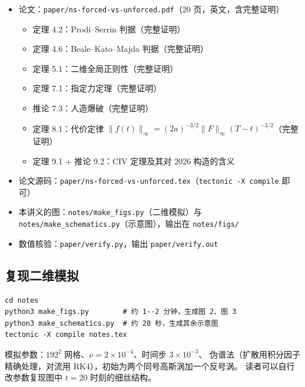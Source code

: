 \documentclass[11pt,a4paper]{article}
\begin{document}
\begin{itemize}[leftmargin=1.6em]
\item 论文：\texttt{paper/ns-forced-vs-unforced.pdf}（20 页，英文，含完整证明）
      \begin{itemize}
      \item 定理 4.2：Prodi--Serrin 判据（完整证明）
      \item 定理 4.6：Beale--Kato--Majda 判据（完整证明）
      \item 定理 5.1：二维全局正则性（完整证明）
      \item 定理 7.1：指定力定理（完整证明）
      \item 推论 7.3：人造爆破（完整证明）
      \item 定理 8.1：代价定律 $\|f(t)\|_\infty=(2a)^{-3/2}\|F\|_\infty(T-t)^{-3/2}$（完整证明）
      \item 定理 9.1 + 推论 9.2：CIV 定理及其对 2026 构造的含义
      \end{itemize}
\item 论文源码：\texttt{paper/ns-forced-vs-unforced.tex}（\texttt{tectonic -X compile} 即可）
\item 本讲义的图：\texttt{notes/make\_figs.py}（二维模拟）与
      \texttt{notes/make\_schematics.py}（示意图），输出在 \texttt{notes/figs/}
\item 数值核验：\texttt{paper/verify.py}，输出 \texttt{paper/verify.out}
\end{itemize}

\subsection*{复现二维模拟}

\begin{verbatim}
cd notes
python3 make_figs.py        # 约 1--2 分钟，生成图 2、图 3
python3 make_schematics.py  # 约 20 秒，生成其余示意图
tectonic -X compile notes.tex
\end{verbatim}

模拟参数：$192^2$ 网格、$\nu=2\times10^{-4}$、时间步 $3\times10^{-3}$、
伪谱法（扩散用积分因子精确处理，对流用 RK4），初始为两个同号高斯涡加一个反号涡。
读者可以自行改参数复现图中 $t=20$ 时刻的细丝结构。
\end{document}

